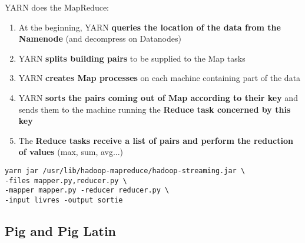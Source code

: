 \documentclass{beamer}[10pt, usepdftitle=false handout]
\begin{document}
\begin{frame}[fragile]

YARN does the MapReduce:
\vspace*{0.6em}

\begin{enumerate}
\item{At the beginning, YARN \textbf{queries the location of the data from the Namenode} (and decompress on Datanodes)}
\item{YARN \textbf{splits building pairs} to be supplied to the Map tasks}
\item{YARN \textbf{creates Map processes} on each machine containing part of the data}
\item{YARN \textbf{sorts the pairs coming out of Map according to their key} and sends them to the machine running the \textbf{Reduce task concerned by this key}}
\item{The \textbf{Reduce tasks receive a list of pairs and perform the reduction of values} (max, sum, avg...)}
\end{enumerate}

\begin{verbatim}
yarn jar /usr/lib/hadoop-mapreduce/hadoop-streaming.jar \
-files mapper.py,reducer.py \
-mapper mapper.py -reducer reducer.py \
-input livres -output sortie
\end{verbatim}

\end{frame}
\subsection{Pig and Pig Latin}
\end{document}
